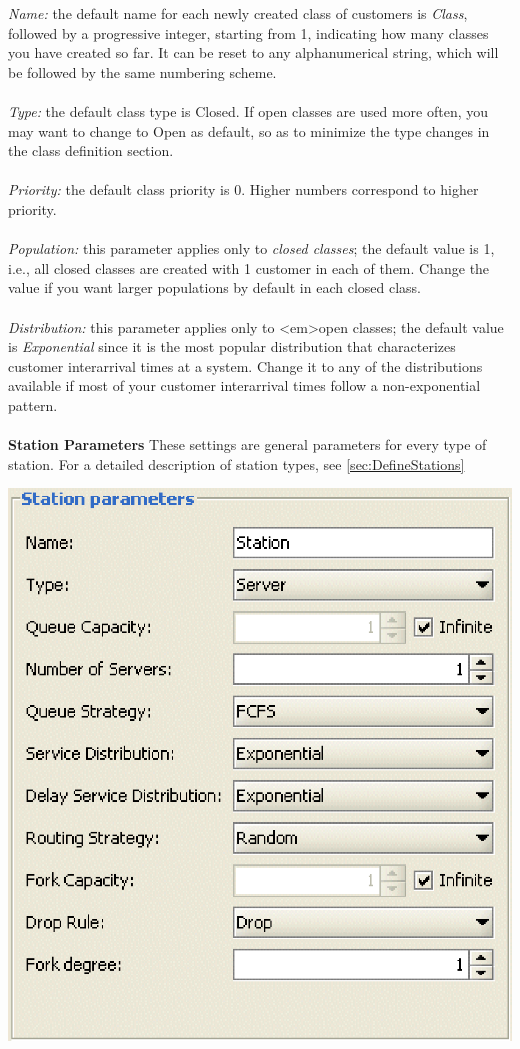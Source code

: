 \begin{description*}
\begin{center}
\end{center}
\emph{Name:} the default name for each newly created class of customers is \emph{Class}, followed by a progressive integer, starting from 1, indicating how many classes you have created so far. It can be reset to any alphanumerical string, which will be followed by the same numbering scheme.\\\\
\emph{Type:}
the default class type is Closed. If open classes are used more often, you may want to change to Open as default, so as to minimize the type changes in the class definition section.\\\\
\emph{Priority:}
the default class priority is 0. Higher numbers correspond to higher priority.\\\\
\emph{Population:}
this parameter applies only to \emph{closed classes}; the default value is 1, i.e., all closed classes are created with 1 customer in each of them. Change the value if you want larger populations by default in each closed class.\\\\
\emph{Distribution:}
this parameter applies only to <em>open classes; the default value is \emph{Exponential} since it is the most popular distribution that characterizes customer interarrival times at a system. Change it to any of the distributions available if most of your customer interarrival times follow a non-exponential pattern.\\\\
\textbf{Station Parameters}
These settings are general parameters for every type of station. For a detailed description of station types, see \autoref{sec:DefineStations}
\begin{center}
\includegraphics[scale=.5]{img/jsim/Station_parameters.eps}

\end{center}
\end{description*}
